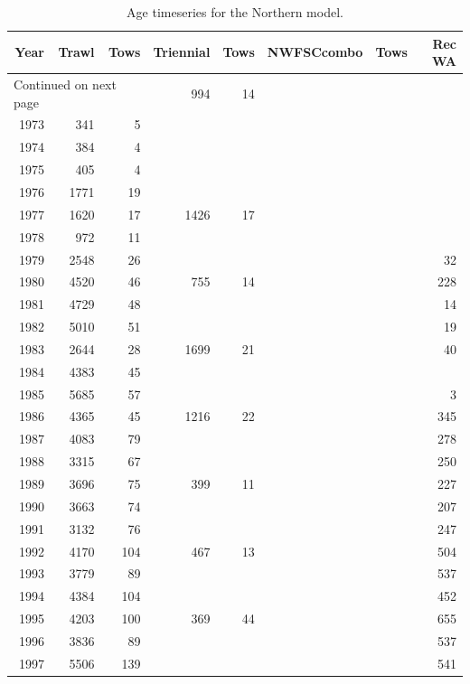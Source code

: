 \documentclass[12pt,]{article}
\begin{document}
\newpage

\begin{longtable}{rrrrrrrr}
\caption{Age timeseries for the Northern model.} \\ 
  \hline
Year & Trawl & Tows & Triennial & Tows & NWFSCcombo & Tows & Rec WA \\ 
  \hline 
\endhead 
\hline 
\multicolumn{3}{l}{\footnotesize Continued on next page} 
\endfoot 
\endlastfoot 
 \hline
1972 &  994 &   14 &  &  &  &  &  \\ 
  1973 &  341 &    5 &  &  &  &  &  \\ 
  1974 &  384 &    4 &  &  &  &  &  \\ 
  1975 &  405 &    4 &  &  &  &  &  \\ 
  1976 & 1771 &   19 &  &  &  &  &  \\ 
  1977 & 1620 &   17 & 1426 &   17 &  &  &  \\ 
  1978 &  972 &   11 &  &  &  &  &  \\ 
  1979 & 2548 &   26 &  &  &  &  &   32 \\ 
  1980 & 4520 &   46 &  755 &   14 &  &  &  228 \\ 
  1981 & 4729 &   48 &  &  &  &  &   14 \\ 
  1982 & 5010 &   51 &  &  &  &  &   19 \\ 
  1983 & 2644 &   28 & 1699 &   21 &  &  &   40 \\ 
  1984 & 4383 &   45 &  &  &  &  &  \\ 
  1985 & 5685 &   57 &  &  &  &  &    3 \\ 
  1986 & 4365 &   45 & 1216 &   22 &  &  &  345 \\ 
  1987 & 4083 &   79 &  &  &  &  &  278 \\ 
  1988 & 3315 &   67 &  &  &  &  &  250 \\ 
  1989 & 3696 &   75 &  399 &   11 &  &  &  227 \\ 
  1990 & 3663 &   74 &  &  &  &  &  207 \\ 
  1991 & 3132 &   76 &  &  &  &  &  247 \\ 
  1992 & 4170 &  104 &  467 &   13 &  &  &  504 \\ 
  1993 & 3779 &   89 &  &  &  &  &  537 \\ 
  1994 & 4384 &  104 &  &  &  &  &  452 \\ 
  1995 & 4203 &  100 &  369 &   44 &  &  &  655 \\ 
  1996 & 3836 &   89 &  &  &  &  &  537 \\ 
  1997 & 5506 &  139 &  &  &  &  &  541 \\ 

\end{longtable}
\end{document}

